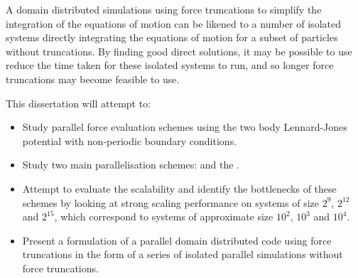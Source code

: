 %
A domain distributed simulations using force truncations to
simplify the integration of the equations of motion can be
likened to a number of isolated systems directly integrating
the equations of motion for a subset of particles without truncations.
%
By finding good direct solutions, it may be possible to use reduce the
time taken for these isolated systems to run, and so longer
force truncations may become feasible to use.



%
This dissertation will attempt to:
\begin{itemize}
\item
    Study parallel force evaluation schemes using
    the two body Lennard-Jones potential with
    non-periodic boundary conditions.

\item
    Study two main parallelisation schemes:
    \replicateddata{} and the \systolicloop{}.

\item
    Attempt to evaluate the scalability and
    identify the bottlenecks of these schemes
    by looking at strong scaling performance
    on systems of size
    $2^{9}$, $2^{12}$ and $2^{15}$, which correspond
    to systems of approximate size $10^2$, $10^3$ and $10^4$.

\item
    Present a formulation of a parallel domain distributed code using
    force truncations in the form of
    a series of isolated parallel simulations
    without force truncations.
\end  {itemize}
